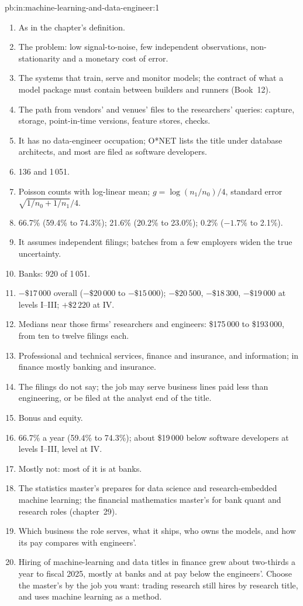 \begin{solution}{pb:in:machine-learning-and-data-engineer:1}
\begin{enumerate}
\item As in the chapter's definition.
\item The problem: low signal-to-noise, few independent observations, non-stationarity and a monetary cost of error.
\item The systems that train, serve and monitor models; the contract of what a model package must contain between builders
and runners (Book~12).
\item The path from vendors' and venues' files to the researchers' queries: capture, storage, point-in-time versions,
feature stores, checks.
\item It has no data-engineer occupation; O*NET lists the title under database architects, and most are filed as software
developers.
\item 136 and 1\,051.
\item Poisson counts with log-linear mean; $g=\log(n_1/n_0)/4$, standard error $\sqrt{1/n_0+1/n_1}/4$.
\item 66.7\% (59.4\% to 74.3\%); 21.6\% (20.2\% to 23.0\%); 0.2\% ($-1.7\%$ to 2.1\%).
\item It assumes independent filings; batches from a few employers widen the true uncertainty.
\item Banks: 920 of 1\,051.
\item $-\$17\,000$ overall ($-\$20\,000$ to $-\$15\,000$); $-\$20\,500$, $-\$18\,300$, $-\$19\,000$ at levels I--III;
$+\$2\,220$ at IV.
\item Medians near those firms' researchers and engineers: \$175\,000 to \$193\,000, from ten to twelve filings each.
\item Professional and technical services, finance and insurance, and information; in finance mostly banking and
insurance.
\item The filings do not say; the job may serve business lines paid less than engineering, or be filed at the analyst end
of the title.
\item Bonus and equity.
\item 66.7\% a year (59.4\% to 74.3\%); about \$19\,000 below software developers at levels I--III, level at IV.
\item Mostly not: most of it is at banks.
\item The statistics master's prepares for data science and research-embedded machine learning; the financial mathematics
master's for bank quant and research roles (chapter~29).
\item Which business the role serves, what it ships, who owns the models, and how its pay compares with engineers'.
\item Hiring of machine-learning and data titles in finance grew about two-thirds a year to fiscal 2025, mostly at banks
and at pay below the engineers'. Choose the master's by the job you want: trading research still hires by research
title, and uses machine learning as a method.
\end{enumerate}
\end{solution}

